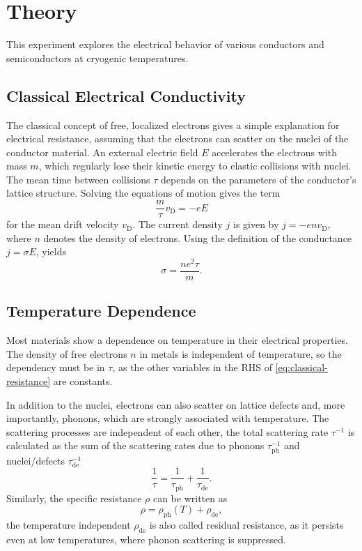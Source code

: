 \chapter{Theory}
This experiment explores the electrical behavior of various conductors and semiconductors at cryogenic temperatures.

\section{Classical Electrical Conductivity}
The classical concept of free, localized electrons gives a simple explanation for electrical resistance, assuming that the electrons can scatter on the nuclei of the conductor material.
An external electric field $E$ accelerates the electrons with mass $m$, which regularly lose their kinetic energy to elastic collisions with nuclei.
The mean time between collisions $\tau$ depends on the parameters of the conductor's lattice structure.
Solving the equations of motion gives the term
\begin{equation*}
	\frac{m}{\tau} v_\text{D} = - e E
\end{equation*}
for the mean drift velocity $v_\text{D}$. The current density $j$ is given by $j = - e n v_\text{D}$, where $n$ denotes the density of electrons.
Using the definition of the conductance $j = \sigma E$, yields
\begin{equation}\label{eq:classical-resistance}
	\sigma = \frac{n e^2 \tau}{m}.
\end{equation}

\section{Temperature Dependence}
Most materials show a dependence on temperature in their electrical properties.
The density of free electrons $n$ in metals is independent of temperature, so the dependency must be in $\tau$, as the other variables in the RHS of \autoref{eq:classical-resistance} are constants.

In addition to the nuclei, electrons can also scatter on lattice defects and, more importantly, phonons, which are strongly associated with temperature.
The scattering processes are independent of each other, the total scattering rate $\tau^{-1}$ is calculated as the sum of the scattering rates due to phonons $\tau_\text{ph}^{-1}$ and nuclei/defects $\tau_\text{de}^{-1}$
\begin{equation*}
	\frac{1}{\tau} = \frac{1}{\tau_\text{ph}} + \frac{1}{\tau_\text{de}}.
\end{equation*}
Similarly, the specific resistance $\rho$ can be written as
\begin{equation*}
	\rho = \rho_\text{ph}(T) + \rho_\text{de},
\end{equation*}
the temperature independent $\rho_\text{de}$ is also called residual resistance, as it persists even at low temperatures, where phonon scattering is suppressed.
